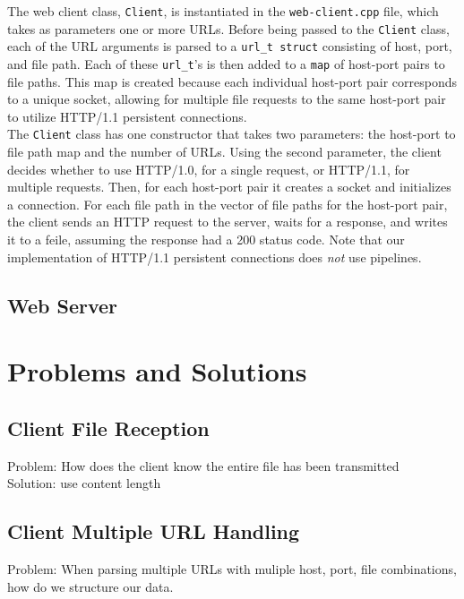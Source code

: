 \documentclass{article}
\begin{document}
The web client class, \texttt{Client}, is instantiated in the \texttt{web-client.cpp} file, which takes as parameters one or more URLs. Before being passed to the \texttt{Client} class, each of the URL arguments is parsed to a \texttt{url\_t struct} consisting of host, port, and file path. Each of these \texttt{url\_t}'s is then added to a \texttt{map} of host-port pairs to file paths. This map is created because each individual host-port pair corresponds to a unique socket, allowing for multiple file requests to the same host-port pair to utilize HTTP/1.1 persistent connections. \\

\noindent
The \texttt{Client} class has one constructor that takes two parameters: the host-port to file path map and the number of URLs. Using the second parameter, the client decides whether to use HTTP/1.0, for a single request, or HTTP/1.1, for multiple requests. Then, for each host-port pair it creates a socket and initializes a connection. For each file path in the vector of file paths for the host-port pair, the client sends an HTTP request to the server, waits for a response, and writes it to a feile, assuming the response had a 200 status code. Note that our implementation of HTTP/1.1 persistent connections does \textit{not} use pipelines.

\subsection{Web Server}

\section{Problems and Solutions}

\subsection{Client File Reception}

Problem: How does the client know the entire file has been transmitted \\

\noindent
Solution: use content length \\

\subsection{Client Multiple URL Handling}

Problem: When parsing multiple URLs with muliple host, port, file combinations, how do we structure our data. \\
\end{document}
